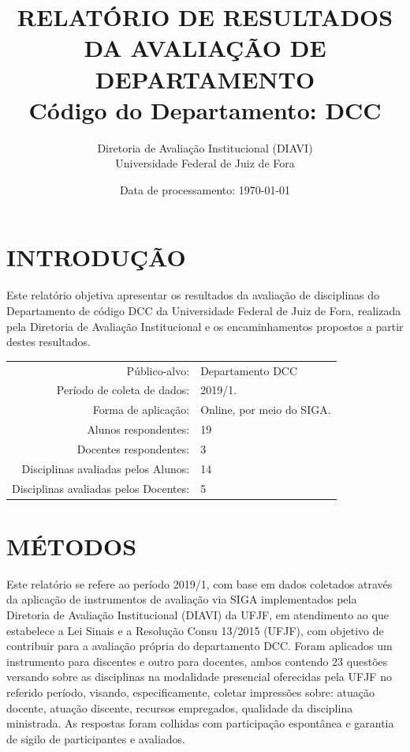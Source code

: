 \documentclass[a4paper,10pt]{article}
\date{Data de processamento: \today}
\begin{document}
\author{Diretoria de Avaliação Institucional (DIAVI) \\ Universidade Federal de Juiz de Fora}

\title{RELATÓRIO DE RESULTADOS DA AVALIAÇÃO DE DEPARTAMENTO\\ Código do Departamento: DCC}
\maketitle
\section{INTRODUÇÃO}
Este relatório objetiva apresentar os resultados da avaliação de disciplinas do Departamento     de código DCC da Universidade Federal de Juiz de Fora, realizada pela     Diretoria de Avaliação Institucional e os encaminhamentos propostos a     partir destes resultados.

\begin{center}
\begin{tabularx}{\linewidth}{r|X}

Público-alvo:& Departamento  DCC\\

Período de coleta de dados:& 2019/1.\\

Forma de aplicação:& Online, por meio do SIGA.\\

Alunos   respondentes:& 19\\

Docentes respondentes:& 3\\

Disciplinas avaliadas pelos   Alunos:& 14\\

Disciplinas avaliadas pelos Docentes:& 5\\
\end{tabularx}
\end{center}

\section{MÉTODOS}
Este relatório se refere ao período 2019/1, com base em dados     coletados através da aplicação de instrumentos de avaliação via SIGA     implementados pela Diretoria de Avaliação Institucional (DIAVI) da UFJF, em atendimento     ao que estabelece a Lei Sinais e a Resolução Consu 13/2015 (UFJF),     com objetivo de contribuir para a avaliação própria do departamento DCC.    Foram aplicados um instrumento para discentes e outro para docentes, ambos contendo     23 questões versando sobre as disciplinas na modalidade presencial oferecidas pela UFJF no     referido período, visando, especificamente, coletar impressões sobre: atuação docente, atuação discente,     recursos empregados, qualidade da disciplina ministrada.     As respostas foram colhidas      com participação espontânea e garantia de    sigilo de participantes e avaliados.
\end{document}
